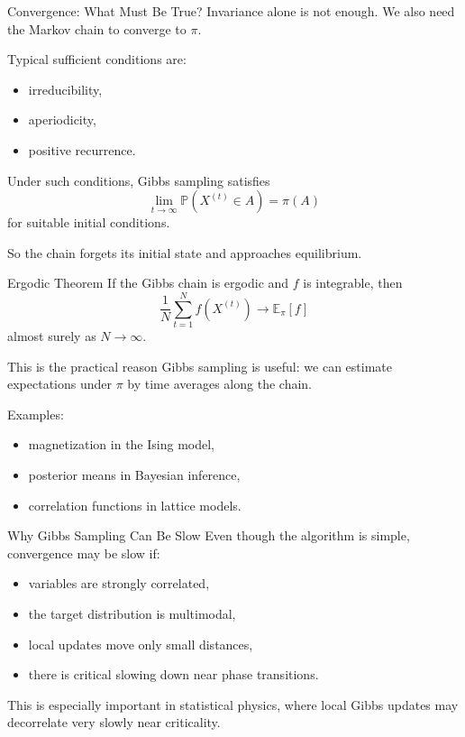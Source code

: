 \documentclass[aspectratio=169]{beamer}
\begin{document}
\begin{frame}{Convergence: What Must Be True?}
Invariance alone is not enough. We also need the Markov chain to converge to \(\pi\).

Typical sufficient conditions are:
\begin{itemize}
    \item irreducibility,
    \item aperiodicity,
    \item positive recurrence.
\end{itemize}

Under such conditions, Gibbs sampling satisfies
\[
\lim_{t\to\infty}\mathbb{P}(X^{(t)}\in A)=\pi(A)
\]
for suitable initial conditions.

So the chain forgets its initial state and approaches equilibrium.
\end{frame}

\begin{frame}{Ergodic Theorem}
If the Gibbs chain is ergodic and \(f\) is integrable, then
\[
\frac{1}{N}\sum_{t=1}^N f(X^{(t)})
\longrightarrow
\mathbb{E}_\pi[f]
\]
almost surely as \(N\to\infty\).

This is the practical reason Gibbs sampling is useful:
we can estimate expectations under \(\pi\) by time averages along the chain.

\medskip

Examples:
\begin{itemize}
    \item magnetization in the Ising model,
    \item posterior means in Bayesian inference,
    \item correlation functions in lattice models.
\end{itemize}
\end{frame}

\begin{frame}{Why Gibbs Sampling Can Be Slow}
Even though the algorithm is simple, convergence may be slow if:
\begin{itemize}
    \item variables are strongly correlated,
    \item the target distribution is multimodal,
    \item local updates move only small distances,
    \item there is critical slowing down near phase transitions.
\end{itemize}

This is especially important in statistical physics, where local Gibbs updates may decorrelate very slowly near criticality.
\end{frame}
\end{document}
